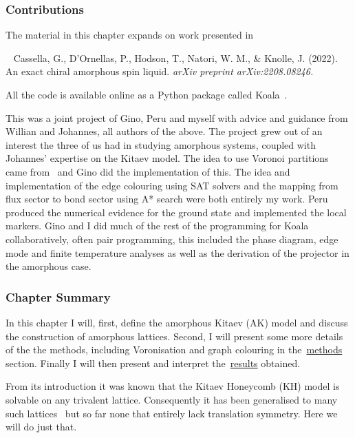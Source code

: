 \hypertarget{ak-contributions}{%
\subsubsection{Contributions}\label{ak-contributions}}

The material in this chapter expands on work presented in

~\autocite{cassellaExactChiralAmorphous2022} Cassella, G., D'Ornellas, P., Hodson, T., Natori, W. M., \& Knolle, J. (2022). An exact chiral amorphous spin liquid. \emph{arXiv preprint arXiv:2208.08246.}

All the code is available online as a Python package called Koala~\autocite{hodsonKoalaKitaevAmorphous2022}.

This was a joint project of Gino, Peru and myself with advice and guidance from Willian and Johannes, all authors of the above. The project grew out of an interest the three of us had in studying amorphous systems, coupled with Johannes' expertise on the Kitaev model. The idea to use Voronoi partitions came from~\autocite{marsalTopologicalWeaireThorpe2020} and Gino did the implementation of this. The idea and implementation of the edge colouring using SAT solvers and the mapping from flux sector to bond sector using A* search were both entirely my work. Peru produced the numerical evidence for the ground state and implemented the local markers. Gino and I did much of the rest of the programming for Koala collaboratively, often pair programming, this included the phase diagram, edge mode and finite temperature analyses as well as the derivation of the projector in the amorphous case.

\hypertarget{ak-summary}{%
\subsubsection{Chapter Summary}\label{ak-summary}}

In this chapter I will, first, define the amorphous Kitaev (AK) model and discuss the construction of amorphous lattices. Second, I will present some more details of the the methods, including Voronisation and graph colouring in the~\protect\hyperlink{amk-methods}{methods} section. Finally I will then present and interpret the~\protect\hyperlink{amk-results}{results} obtained.

From its introduction it was known that the Kitaev Honeycomb (KH) model is solvable on any trivalent lattice. Consequently it has been generalised to many such lattices~\autocite{eschmannThermodynamicClassificationThreedimensional2020,Yao2009,eschmann2019thermodynamics,Peri2020} but so far none that entirely lack translation symmetry. Here we will do just that.

